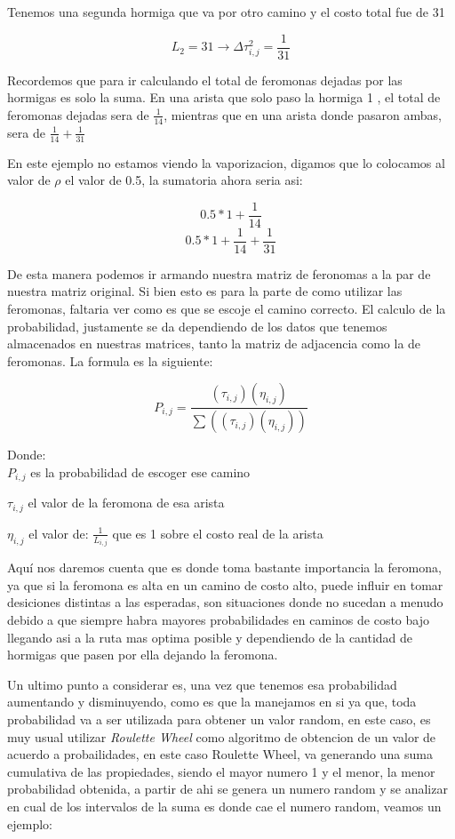 \documentclass{article}
\begin{document}
Tenemos una segunda hormiga que va por otro camino y el costo total fue de 31

$$L_2=31 \rightarrow \Delta\tau_{i,j}^2=\frac{1}{31}$$

Recordemos que para ir calculando el total de feromonas dejadas por las hormigas es solo la suma. En una arista que solo paso la hormiga 1
, el total de feromonas dejadas sera de $\frac{1}{14}$, mientras que en una arista donde pasaron ambas, sera de $\frac{1}{14}+\frac{1}{31}$

En este ejemplo no estamos viendo la vaporizacion, digamos que lo colocamos al valor de \textit{$\rho$} el valor de 0.5, la sumatoria ahora seria asi:

$$0.5*1+\frac{1}{14}$$
$$0.5*1+\frac{1}{14}+\frac{1}{31}$$

De esta manera podemos ir armando nuestra matriz de feronomas a la par de nuestra matriz original.
Si bien esto es para la parte de como utilizar las feromonas, faltaria ver como es que se escoje el camino correcto.
El calculo de la probabilidad, justamente se da dependiendo de los datos que tenemos almacenados en nuestras matrices, tanto la matriz de adjacencia
como la de feromonas.
La formula es la siguiente:

$$P_{i,j}=\frac{(\tau_{i,j})(\eta_{i,j})}{\sum((\tau_{i,j})(\eta_{i,j}))}$$

Donde:\\

    \hspace{1cm}$P_{i,j}$ es la probabilidad de escoger ese camino

    \hspace{1cm}$\tau_{i,j}$ el valor de la feromona de esa arista

    \hspace{1cm}$\eta_{i,j}$ el valor de: $\frac{1}{L_{i,j}}$ que es 1 sobre el costo real de la arista

    \vspace{5mm}

Aquí nos daremos cuenta que es donde toma bastante importancia la feromona, ya que si la feromona es alta en un camino de costo alto, puede influir en tomar
desiciones distintas a las esperadas, son situaciones donde no sucedan a menudo debido a que siempre habra mayores probabilidades en caminos de costo bajo
llegando asi a la ruta mas optima posible y dependiendo de la cantidad de hormigas que pasen por ella dejando la feromona.

Un ultimo punto a considerar es, una vez que tenemos esa probabilidad aumentando y disminuyendo, como es que la manejamos en si ya que,
toda probabilidad va a ser utilizada para obtener un valor random, en este caso, es muy usual utilizar \textit{Roulette Wheel} como algoritmo de obtencion
de un valor de acuerdo a probailidades, en este caso Roulette Wheel, va generando una suma cumulativa de las propiedades, siendo el mayor numero 1 y el menor,
la menor probabilidad obtenida, a partir de ahi se genera un numero random y se analizar en cual de los intervalos de la suma es donde cae el numero random, veamos un ejemplo:
\end{document}
